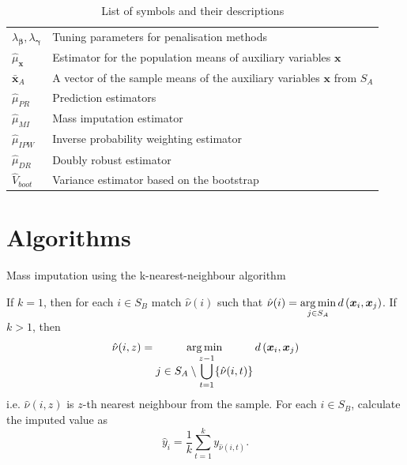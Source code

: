 \documentclass[
]{jss}
\begin{document}
\begin{table}[ht!]
\begin{tabular}{ll}
$\lambda_{\boldsymbol{\beta}}, \lambda_{\boldsymbol{\gamma}}$ & Tuning parameters for penalisation methods \\
$\hat{\mu}_{\boldsymbol{x}}$ & Estimator for the population means of auxiliary variables $\boldsymbol{x}$ \\
$\bar{\boldsymbol{x}}_{A}$ & A vector of the sample means of the auxiliary variables $\boldsymbol{x}$ from $S_A$ \\ 
$\hat{\mu}_{PR}$ & Prediction estimators \\
$\hat{\mu}_{MI}$ & Mass imputation estimator \\
$\hat{\mu}_{IPW}$ & Inverse probability weighting estimator \\
$\hat{\mu}_{DR}$ & Doubly robust estimator \\
$\hat{V}_{boot}$ & Variance estimator based on the bootstrap \\
\hline
\end{tabular}
\caption{List of symbols and their descriptions}
\label{tab-list-of-symbols}
\end{table}

\clearpage

\section{Algorithms}\label{sec-details}

\begin{algorithm}[ht!]
\caption{Mass imputation using the k-nearest-neighbour algorithm}
\label{algo-2}
\begin{algorithmic}[1]
\State If $k=1$, then for each $i \in S_B$ match $\hat{\nu}(i)$ such that
$\displaystyle \hat{\nu}(i)=
\operatornamewithlimits{arg\,min}_{j\in S_{A}}d\left(\boldsymbol{x}_i,\boldsymbol{x}_j\right)$.
\State If $k>1$, then
$$\hat{\nu}(i, z) = \operatornamewithlimits{arg\,min}_{\displaystyle j\in S_{A}\setminus\bigcup_{t=1}^{z-1}
\{\hat{\nu}(i, t)\}} d\left(\boldsymbol{x}_i, \boldsymbol{x}_j\right)$$
i.e. $\hat{\nu}(i, z)$ is $z$-th nearest neighbour from the sample.\;
\State For each $i \in S_B$, calculate the imputed value as
$$
\hat{y}_i = \frac{1}{k}\sum_{t=1}^{k}y_{\hat{\nu}(i, t)}.
$$
\end{algorithmic}
\end{algorithm}
\end{document}
